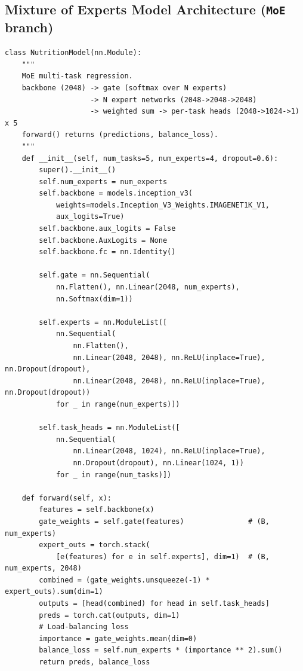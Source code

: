 \documentclass[11pt,a4paper]{article}
\begin{document}
\subsection{Mixture of Experts Model Architecture (\texttt{MoE} branch)}

\begin{lstlisting}[caption={NutritionModel class --- Mixture of Experts architecture.}]
class NutritionModel(nn.Module):
    """
    MoE multi-task regression.
    backbone (2048) -> gate (softmax over N experts)
                    -> N expert networks (2048->2048->2048)
                    -> weighted sum -> per-task heads (2048->1024->1) x 5
    forward() returns (predictions, balance_loss).
    """
    def __init__(self, num_tasks=5, num_experts=4, dropout=0.6):
        super().__init__()
        self.num_experts = num_experts
        self.backbone = models.inception_v3(
            weights=models.Inception_V3_Weights.IMAGENET1K_V1,
            aux_logits=True)
        self.backbone.aux_logits = False
        self.backbone.AuxLogits = None
        self.backbone.fc = nn.Identity()

        self.gate = nn.Sequential(
            nn.Flatten(), nn.Linear(2048, num_experts),
            nn.Softmax(dim=1))

        self.experts = nn.ModuleList([
            nn.Sequential(
                nn.Flatten(),
                nn.Linear(2048, 2048), nn.ReLU(inplace=True), nn.Dropout(dropout),
                nn.Linear(2048, 2048), nn.ReLU(inplace=True), nn.Dropout(dropout))
            for _ in range(num_experts)])

        self.task_heads = nn.ModuleList([
            nn.Sequential(
                nn.Linear(2048, 1024), nn.ReLU(inplace=True),
                nn.Dropout(dropout), nn.Linear(1024, 1))
            for _ in range(num_tasks)])

    def forward(self, x):
        features = self.backbone(x)
        gate_weights = self.gate(features)               # (B, num_experts)
        expert_outs = torch.stack(
            [e(features) for e in self.experts], dim=1)  # (B, num_experts, 2048)
        combined = (gate_weights.unsqueeze(-1) * expert_outs).sum(dim=1)
        outputs = [head(combined) for head in self.task_heads]
        preds = torch.cat(outputs, dim=1)
        # Load-balancing loss
        importance = gate_weights.mean(dim=0)
        balance_loss = self.num_experts * (importance ** 2).sum()
        return preds, balance_loss
\end{lstlisting}
\end{document}
